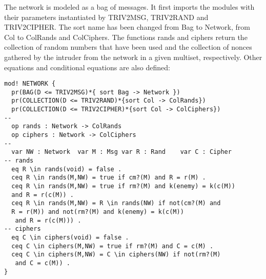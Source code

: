 \documentclass[a4paper,fleqn]{cas-dc}
\begin{document}
The network is modeled as a bag of messages. 
It first imports the modules with their parameters instantiated by TRIV2MSG, TRIV2RAND and TRIV2CIPHER. The sort name has been changed from Bag to Network, from
Col to ColRands and ColCiphers.
The functions rands and ciphers return the collection of random numbers that have been used and the collection of nonces gathered by
the intruder from the network in a given multiset, respectively. Other equations and conditional equations are also defined:
\begin{small}
\begin{verbatim}
mod! NETWORK {
  pr(BAG(D <= TRIV2MSG)*{ sort Bag -> Network })
  pr(COLLECTION(D <= TRIV2RAND)*{sort Col -> ColRands})
  pr(COLLECTION(D <= TRIV2CIPHER)*{sort Col -> ColCiphers})
--
  op rands : Network -> ColRands
  op ciphers : Network -> ColCiphers
--
  var NW : Network  var M : Msg var R : Rand    var C : Cipher
-- rands
  eq R \in rands(void) = false .
  ceq R \in rands(M,NW) = true if cm?(M) and R = r(M) .
  ceq R \in rands(M,NW) = true if rm?(M) and k(enemy) = k(c(M)) 
  and R = r(c(M)) .
  ceq R \in rands(M,NW) = R \in rands(NW) if not(cm?(M) and 
  R = r(M)) and not(rm?(M) and k(enemy) = k(c(M)) 
   and R = r(c(M))) .
-- ciphers
  eq C \in ciphers(void) = false .
  ceq C \in ciphers(M,NW) = true if rm?(M) and C = c(M) .
  ceq C \in ciphers(M,NW) = C \in ciphers(NW) if not(rm?(M) 
   and C = c(M)) .
}
\end{verbatim}
\end{small}
\end{document}

